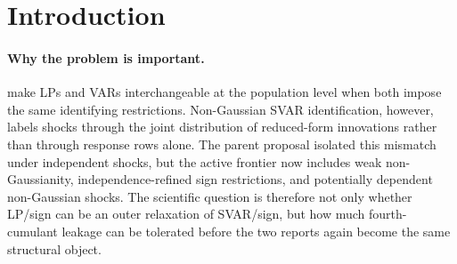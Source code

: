 \documentclass[11pt]{article}
\theoremstyle{definition}
\theoremstyle{plain}
\theoremstyle{remark}
\begin{document}
\begin{abstract}
This proposal upgrades the banked \texttt{eid\_lp\_svar\_nonequiv}/\texttt{v1} kernel by replacing exact independent-component fourth-cumulant diagonalization with an \(\eta\)-bounded co-kurtosis leakage class.  The parent asked whether LP/sign and non-Gaussian SVAR/sign impulse-response sets differ when the SVAR shock label is supplied by independent non-Gaussian shocks; the upgrade asks for observable rank and transversality conditions under which a locally certified quartic residual is the first leakage radius at which the LP support face becomes compatible with the same higher-cumulant shock law.  The flagship conjecture no longer assumes uniqueness, positivity, or residual separation: it derives them from a finite active-set certificate \(\mathfrak C_w(P)\) and proves that the resulting residual \(\eta_w^\dagger(P)\) equals the global first-contact radius \(\eta_w^*(P)\).  The parent theorem is recovered as the \(\eta=0\) corner, and the Plagborg-Moller--Wolf common-restriction equivalence is recovered when the LP side is required to impose the same contact restriction.  If resolved, the result would give users of non-Gaussian and independence-refined SVARs a scalar diagnostic for when an LP sign-restricted robustness report is still about the same structural shock under weakly dependent, non-Gaussian innovations.
\end{abstract}

\section{Introduction}
\paragraph{Why the problem is important.}
\citet{PlagborgMollerWolf2021} make LPs and VARs interchangeable at the population level when both impose the same identifying restrictions.  Non-Gaussian SVAR identification, however, labels shocks through the joint distribution of reduced-form innovations rather than through response rows alone.  The parent proposal isolated this mismatch under independent shocks, but the active frontier now includes weak non-Gaussianity, independence-refined sign restrictions, and potentially dependent non-Gaussian shocks.  The scientific question is therefore not only whether LP/sign can be an outer relaxation of SVAR/sign, but how much fourth-cumulant leakage can be tolerated before the two reports again become the same structural object.
\end{document}
